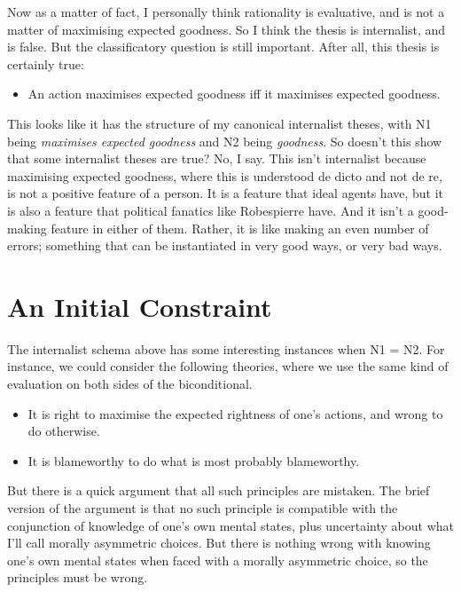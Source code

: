 \documentclass[
  10pt,
  letterpaper,
  twoside]{scrbook}
\providecommand{\tightlist}{%
  \setlength{\itemsep}{0pt}\setlength{\parskip}{0pt}}\usepackage{longtable,booktabs,array}
\begin{document}
Now as a matter of fact, I personally think rationality is evaluative,
and is not a matter of maximising expected goodness. So I think the
thesis is internalist, and is false. But the classificatory question is
still important. After all, this thesis is certainly true:

\begin{itemize}
\tightlist
\item
  An action maximises expected goodness iff it maximises expected
  goodness.
\end{itemize}

This looks like it has the structure of my canonical internalist theses,
with N1 being \emph{maximises expected goodness} and N2 being
\emph{goodness}. So doesn't this show that some internalist theses are
true? No, I say. This isn't internalist because maximising expected
goodness, where this is understood de dicto and not de re, is not a
positive feature of a person. It is a feature that ideal agents have,
but it is also a feature that political fanatics like {Robespierre}
have. And it isn't a good-making feature in either of them. Rather, it
is like making an even number of errors; something that can be
instantiated in very good ways, or very bad ways.

\section{An Initial Constraint}\label{aninitialconstraint}

The internalist schema above has some interesting instances when N1 =
N2. For instance, we could consider the following theories, where we use
the same kind of evaluation on both sides of the biconditional.

\begin{itemize}
\tightlist
\item
  It is right to maximise the expected rightness of one's actions, and
  wrong to do otherwise.
\item
  It is blameworthy to do what is most probably blameworthy.
\end{itemize}

But there is a quick argument that all such principles are mistaken. The
brief version of the argument is that no such principle is compatible
with the conjunction of knowledge of one's own mental states, plus
uncertainty about what I'll call morally asymmetric choices. But there
is nothing wrong with knowing one's own mental states when faced with a
morally asymmetric choice, so the principles must be wrong.
\end{document}
